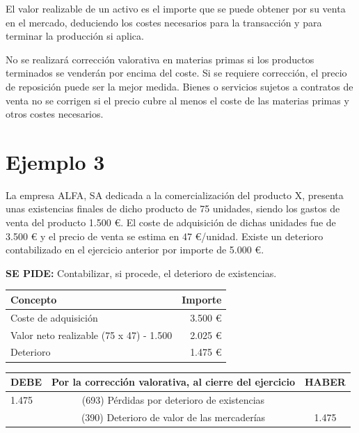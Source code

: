\documentclass{article}
\begin{document}
El valor realizable de un activo es el importe que se puede obtener por su venta en el mercado, deduciendo los costes necesarios para la transacción y para terminar la producción si aplica.

No se realizará corrección valorativa en materias primas si los productos terminados se venderán por encima del coste. Si se requiere corrección, el precio de reposición puede ser la mejor medida. Bienes o servicios sujetos a contratos de venta no se corrigen si el precio cubre al menos el coste de las materias primas y otros costes necesarios.

\section*{Ejemplo 3}

La empresa ALFA, SA dedicada a la comercialización del producto X, presenta unas existencias finales de dicho producto de 75 unidades, siendo los gastos de venta del producto 1.500 €. El coste de adquisición de dichas unidades fue de 3.500 € y el precio de venta se estima en 47 €/unidad. Existe un deterioro contabilizado en el ejercicio anterior por importe de 5.000 €.

\textbf{SE PIDE:} Contabilizar, si procede, el deterioro de existencias.

\begin{table}[H]
    \centering
    \begin{tabular}{|l|r|}
        \hline
        \textbf{Concepto} & \textbf{Importe} \\
        \hline
        Coste de adquisición & 3.500 € \\
        \hline
        Valor neto realizable (75 x 47) - 1.500 & 2.025 € \\
        \hline
        Deterioro & 1.475 € \\
        \hline
    \end{tabular}
\end{table}

\begin{table}[H]
    \centering
    \begin{tabular}{|l|c|c|}
        \hline
        \textbf{DEBE} & \textbf{Por la corrección valorativa, al cierre del ejercicio} & \textbf{HABER} \\
        \hline
        1.475 & (693) Pérdidas por deterioro de existencias &  \\
         & (390) Deterioro de valor de las mercaderías & 1.475 \\
        \hline
    \end{tabular}
\end{table}
\end{document}
